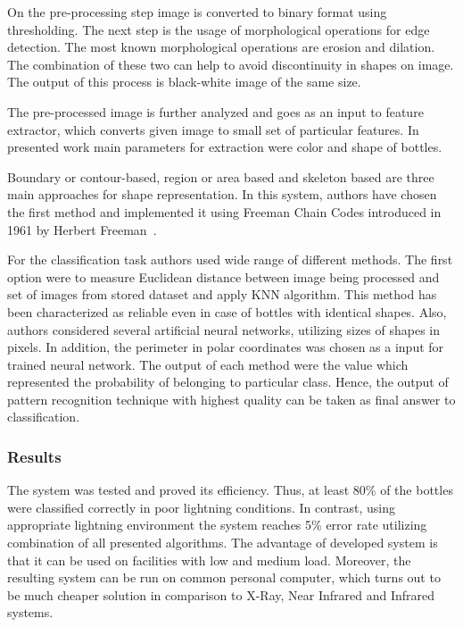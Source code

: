 \documentclass{lutmscthesis}[2010/09/22]
\begin{document}
On the pre-processing step image is converted
to binary format using thresholding. The next step is
the usage of morphological operations for
edge detection. The most known morphological operations
are erosion and dilation. The combination of these
two can help to avoid discontinuity in shapes
on image. The output of this process is black-white
image of the same size.

The pre-processed image is further analyzed and
goes as an input to feature extractor, which converts
given image to small set of particular features. In presented
work main parameters for extraction were color and
shape of bottles.

Boundary or contour-based, region or area based and skeleton based
are three main approaches for shape representation.
In this system, authors have chosen the first method
and implemented it using Freeman Chain Codes introduced
in 1961 by Herbert Freeman~\cite{Freeman:1961}.

For the classification task authors used wide range of different
methods. The first option were to measure Euclidean distance between
image being processed and set of images from stored
dataset and apply KNN algorithm. This method has been characterized as reliable
even in case of bottles with identical shapes. Also,
authors considered several artificial neural networks,
utilizing sizes of shapes in pixels. In addition,
the perimeter in polar coordinates was chosen
as a input for trained neural network. The output
of each method were the value which represented
the probability of belonging to particular class. Hence, the
output of pattern recognition technique with highest quality
can be taken as final answer to classification.

\subsubsection*{ Results }

The system was tested and proved its efficiency. Thus,
at least 80\% of the bottles were classified correctly
in poor lightning conditions. In contrast, using
appropriate lightning environment the system reaches
5\% error rate utilizing combination of all presented
algorithms. The advantage of developed system is that
it can be used on facilities with low and medium
load. Moreover, the resulting system can be run
on common personal computer, which turns out
to be much cheaper solution in comparison to
X-Ray, Near Infrared and Infrared systems.
\end{document}
